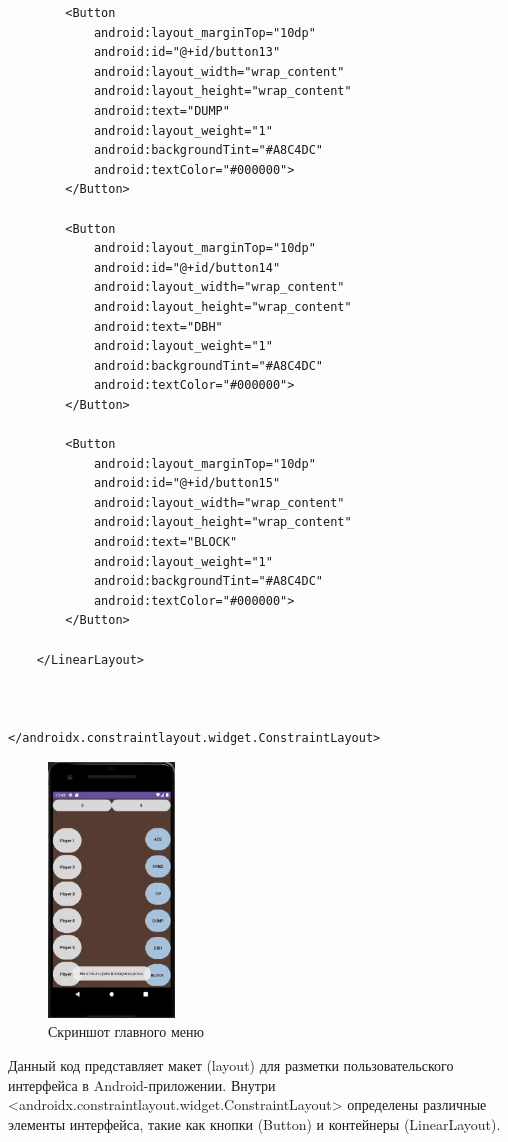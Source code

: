 \documentclass[12pt]{article}
\begin{document}
\begin{verbatim}
        <Button
            android:layout_marginTop="10dp"
            android:id="@+id/button13"
            android:layout_width="wrap_content"
            android:layout_height="wrap_content"
            android:text="DUMP"
            android:layout_weight="1"
            android:backgroundTint="#A8C4DC"
            android:textColor="#000000">
        </Button>

        <Button
            android:layout_marginTop="10dp"
            android:id="@+id/button14"
            android:layout_width="wrap_content"
            android:layout_height="wrap_content"
            android:text="DBH"
            android:layout_weight="1"
            android:backgroundTint="#A8C4DC"
            android:textColor="#000000">
        </Button>

        <Button
            android:layout_marginTop="10dp"
            android:id="@+id/button15"
            android:layout_width="wrap_content"
            android:layout_height="wrap_content"
            android:text="BLOCK"
            android:layout_weight="1"
            android:backgroundTint="#A8C4DC"
            android:textColor="#000000">
        </Button>

    </LinearLayout>



</androidx.constraintlayout.widget.ConstraintLayout>

    \end{verbatim}

    \begin{figure}[ht]
        \centering
        \includegraphics[width=0.3\textwidth]{image/main_menu.png}
        \caption{Скриншот главного меню}
    \end{figure}

    Данный код представляет макет (layout) для разметки пользовательского интерфейса в Android-приложении.
    Внутри <androidx.constraintlayout.widget.ConstraintLayout> определены различные элементы интерфейса, такие как кнопки (Button) и контейнеры (LinearLayout).
\end{document}
